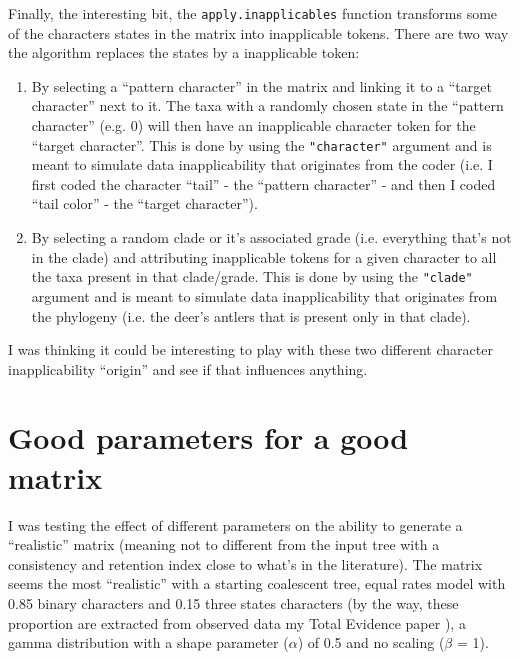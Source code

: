 \documentclass{article}\usepackage[]{graphicx}\usepackage[]{color}
\begin{document}
Finally, the interesting bit, the \texttt{apply.inapplicables} function transforms some of the characters states in the matrix into inapplicable tokens.
There are two way the algorithm replaces the states by a inapplicable token:
\begin{enumerate}
\item By selecting a ``pattern character'' in the matrix and linking it to a ``target character'' next to it.
The taxa with a randomly chosen state in the ``pattern character'' (e.g. 0) will then have an inapplicable character token for the ``target character''.
This is done by using the \texttt{"character"} argument and is meant to simulate data inapplicability that originates from the coder (i.e. I first coded the character ``tail'' - the ``pattern character'' - and then I coded ``tail color'' - the ``target character'').
\item By selecting a random clade or it's associated grade (i.e. everything that's not in the clade) and attributing inapplicable tokens for a given character to all the taxa present in that clade/grade.
This is done by using the \texttt{"clade"} argument and is meant to simulate data inapplicability that originates from the phylogeny (i.e. the deer's antlers that is present only in that clade).
\end{enumerate}

I was thinking it could be interesting to play with these two different character inapplicability ``origin'' and see if that influences anything.

\section{Good parameters for a good matrix}

I was testing the effect of different parameters on the ability to generate a ``realistic'' matrix (meaning not to different from the input tree with a consistency and retention index close to what's in the literature).
The matrix seems the most ``realistic'' with a starting coalescent tree, equal rates model with 0.85 binary characters and 0.15 three states characters (by the way, these proportion are extracted from observed data my Total Evidence paper \cite{GuillermeCooper}), a gamma distribution with a shape parameter ($\alpha$) of 0.5 and no scaling ($\beta$ = 1).
\end{document}

